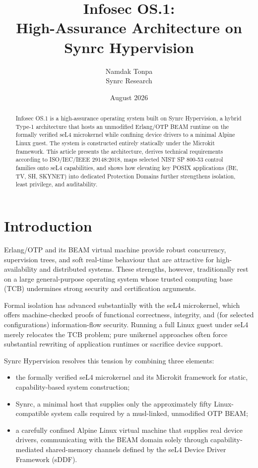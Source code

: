 \documentclass{article}
\title{Infosec OS.1:\\
High-Assurance Architecture on Synrc Hypervision}
\author{Namdak Tonpa\\Synrc Research}
\date{August 2026}
\begin{document}
\maketitle

\begin{abstract}
Infosec OS.1 is a high-assurance operating system built on Synrc Hypervision,
a hybrid Type-1 architecture that hosts an unmodified Erlang/OTP BEAM runtime
on the formally verified seL4 microkernel while confining device drivers to a
minimal Alpine Linux guest. The system is constructed entirely statically under
the Microkit framework. This article presents the architecture, derives
technical requirements according to ISO/IEC/IEEE 29148:2018, maps selected
NIST SP 800-53 control families onto seL4 capabilities, and shows how elevating
key POSIX applications (BE, TV, SH, SKYNET) into dedicated Protection Domains
further strengthens isolation, least privilege, and auditability.
\end{abstract}

\tableofcontents
\newpage

\section{Introduction}

Erlang/OTP and its BEAM virtual machine provide robust concurrency, supervision
trees, and soft real-time behaviour that are attractive for high-availability
and distributed systems. These strengths, however, traditionally rest on a
large general-purpose operating system whose trusted computing base (TCB)
undermines strong security and certification arguments.

Formal isolation has advanced substantially with the seL4 microkernel, which
offers machine-checked proofs of functional correctness, integrity, and
(for selected configurations) information-flow security. Running a full Linux
guest under seL4 merely relocates the TCB problem; pure unikernel approaches
often force substantial rewriting of application runtimes or sacrifice device
support.

Synrc Hypervision resolves this tension by combining three elements:
\begin{itemize}[leftmargin=*]
  \item the formally verified seL4 microkernel and its Microkit framework for
        static, capability-based system construction;
  \item Synrc, a minimal host that supplies only the approximately fifty
        Linux-compatible system calls required by a musl-linked, unmodified
        OTP BEAM;
  \item a carefully confined Alpine Linux virtual machine that supplies real
        device drivers, communicating with the BEAM domain solely through
        capability-mediated shared-memory channels defined by the seL4 Device
        Driver Framework (sDDF).
\end{itemize}
\end{document}
